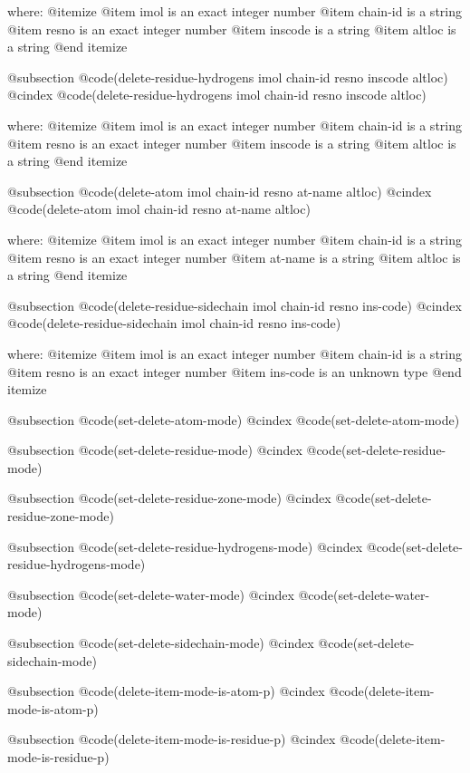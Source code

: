 where: 
 @itemize 
     @item imol is an exact integer number
     @item chain-id is a string
     @item resno is an exact integer number
     @item inscode is a string
     @item altloc is a string
 @end itemize


@subsection @code{(delete-residue-hydrogens imol chain-id resno inscode altloc)}
@cindex @code{(delete-residue-hydrogens imol chain-id resno inscode altloc)}
 
where: 
 @itemize 
     @item imol is an exact integer number
     @item chain-id is a string
     @item resno is an exact integer number
     @item inscode is a string
     @item altloc is a string
 @end itemize


@subsection @code{(delete-atom imol chain-id resno at-name altloc)}
@cindex @code{(delete-atom imol chain-id resno at-name altloc)}
 
where: 
 @itemize 
     @item imol is an exact integer number
     @item chain-id is a string
     @item resno is an exact integer number
     @item at-name is a string
     @item altloc is a string
 @end itemize


@subsection @code{(delete-residue-sidechain imol chain-id resno ins-code)}
@cindex @code{(delete-residue-sidechain imol chain-id resno ins-code)}
 
where: 
 @itemize 
     @item imol is an exact integer number
     @item chain-id is a string
     @item resno is an exact integer number
     @item ins-code is an unknown type
 @end itemize


@subsection @code{(set-delete-atom-mode)}
@cindex @code{(set-delete-atom-mode)}
 
@subsection @code{(set-delete-residue-mode)}
@cindex @code{(set-delete-residue-mode)}
 
@subsection @code{(set-delete-residue-zone-mode)}
@cindex @code{(set-delete-residue-zone-mode)}
 
@subsection @code{(set-delete-residue-hydrogens-mode)}
@cindex @code{(set-delete-residue-hydrogens-mode)}
 
@subsection @code{(set-delete-water-mode)}
@cindex @code{(set-delete-water-mode)}
 
@subsection @code{(set-delete-sidechain-mode)}
@cindex @code{(set-delete-sidechain-mode)}
 
@subsection @code{(delete-item-mode-is-atom-p)}
@cindex @code{(delete-item-mode-is-atom-p)}
 
@subsection @code{(delete-item-mode-is-residue-p)}
@cindex @code{(delete-item-mode-is-residue-p)}
 
